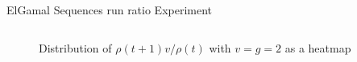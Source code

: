 \begin{frame}{ElGamal Sequences run ratio Experiment}
\begin{columns}
\begin{column}{0.45\textwidth}
\begin{figure}
                \caption{Distribution of $\rho(t+1)v/\rho(t)$ with $v = g = 2$ as a heatmap}
            \end{figure}
        \end{column}
    \end{columns}
\end{frame}
 	

